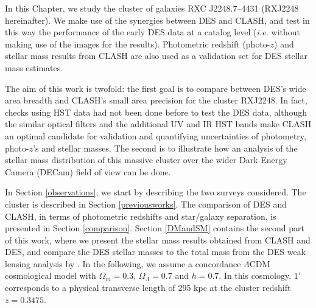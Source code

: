 {In this Chapter, we study the cluster of galaxies RXC J2248.7--4431 (RXJ2248 hereinafter). We make use of the synergies between DES and CLASH, and test in this way the performance of the early DES data at a catalog level (\emph{i.e.} without making use of the images for the results). Photometric redshift (photo-$z$) and stellar mass results from CLASH are also used as a validation set for DES stellar mass estimates.

The aim of this work is twofold: the first goal is to compare between DES's wide area breadth and CLASH's small area precision for the cluster RXJ2248. In fact, checks using HST data had not been done before to test the DES data, although the similar optical filters and the additional UV and IR HST bands make CLASH an optimal candidate for validation  and quantifying uncertainties of photometry, photo-$z$'s and stellar masses. The second is to illustrate how an analysis of the stellar mass distribution of this massive cluster over the wider Dark Energy Camera (DECam) field of view can be done. 

In Section \ref{observations}, we start by describing the two surveys considered. The cluster is described in Section \ref{previousworks}. The comparison of DES and CLASH, in terms of photometric redshifts and star/galaxy separation, is presented in Section \ref{comparison}. Section \ref{DMandSM} contains the second part of this work, where we present the stellar mass results obtained from CLASH and DES, and compare the DES stellar masses to the total mass from the DES weak lensing analysis by \citet{melchior}. 
In the following, we assume a concordance $\Lambda$CDM cosmological model with $\Omega_m =0.3$, $\Omega_\Lambda =0.7$ and $h=0.7$. In this cosmology, $1'$ corresponds to a physical transverse length of 295 kpc at the cluster redshift $z=0.3475$. 



}
